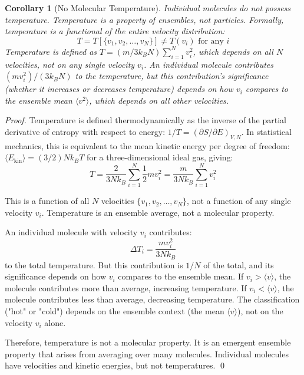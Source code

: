 \documentclass[12pt,a4paper]{article}
\newtheorem{corollary}[theorem]{Corollary}
\theoremstyle{definition}
\theoremstyle{remark}
\begin{document}
\begin{corollary}[No Molecular Temperature]
\label{cor:no_molecular_temperature}
Individual molecules do not possess temperature. Temperature is a property of ensembles, not particles. Formally, temperature is a functional of the entire velocity distribution:
\begin{equation}
T = T[\{v_1, v_2, \ldots, v_N\}] \neq T(v_i) \text{ for any } i
\label{eq:temperature_functional}
\end{equation}
Temperature is defined as $T = (m / 3k_B N) \sum_{i=1}^N v_i^2$, which depends on all $N$ velocities, not on any single velocity $v_i$. An individual molecule contributes $(m v_i^2) / (3k_B N)$ to the temperature, but this contribution's significance (whether it increases or decreases temperature) depends on how $v_i$ compares to the ensemble mean $\langle v^2 \rangle$, which depends on all other velocities.
\end{corollary}

\begin{proof}
Temperature is defined thermodynamically as the inverse of the partial derivative of entropy with respect to energy: $1/T = (\partial S / \partial E)_{V,N}$. In statistical mechanics, this is equivalent to the mean kinetic energy per degree of freedom: $\langle E_{\text{kin}} \rangle = (3/2) N k_B T$ for a three-dimensional ideal gas, giving:
\begin{equation}
T = \frac{2}{3N k_B} \sum_{i=1}^N \frac{1}{2} m v_i^2 = \frac{m}{3N k_B} \sum_{i=1}^N v_i^2
\end{equation}

This is a function of all $N$ velocities $\{v_1, v_2, \ldots, v_N\}$, not a function of any single velocity $v_i$. Temperature is an ensemble average, not a molecular property.

An individual molecule with velocity $v_i$ contributes:
\begin{equation}
\Delta T_i = \frac{m v_i^2}{3N k_B}
\end{equation}
to the total temperature. But this contribution is $1/N$ of the total, and its significance depends on how $v_i$ compares to the ensemble mean. If $v_i > \langle v \rangle$, the molecule contributes more than average, increasing temperature. If $v_i < \langle v \rangle$, the molecule contributes less than average, decreasing temperature. The classification ("hot" or "cold") depends on the ensemble context (the mean $\langle v \rangle$), not on the velocity $v_i$ alone.

Therefore, temperature is not a molecular property. It is an emergent ensemble property that arises from averaging over many molecules. Individual molecules have velocities and kinetic energies, but not temperatures. \qed
\end{proof}
\end{document}
